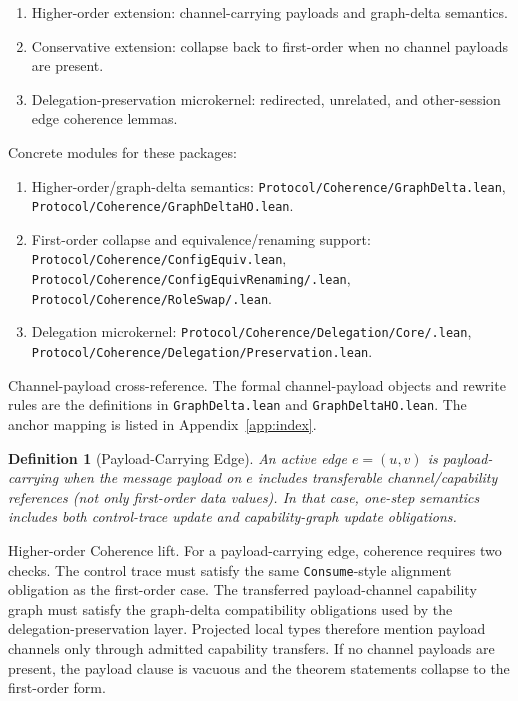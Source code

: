 \documentclass[a4paper,10pt,twocolumn,english]{article}
\numberwithin{equation}{section}
\theoremstyle{paperdef}
\newtheorem{definition}{Definition}[section]
\theoremstyle{paperplain}
\theoremstyle{paperdef}
\theoremstyle{paperremark}
\theoremstyle{paperdef}
\begin{document}
	{\footnotesize
		\begin{enumerate}
			\item Higher-order extension: channel-carrying payloads and graph-delta semantics.
			\item Conservative extension: collapse back to first-order when no channel payloads are present.
			\item Delegation-preservation microkernel: redirected, unrelated, and other-session edge coherence lemmas.
		\end{enumerate}
	}

Concrete modules for these packages:
\begin{enumerate}
	\item Higher-order/graph-delta semantics:
	      \texttt{Protocol/\allowbreak Coherence/\allowbreak GraphDelta.lean},
	      \texttt{Protocol/\allowbreak Coherence/\allowbreak GraphDeltaHO.lean}.
	\item First-order collapse and equivalence/renaming support:
	      \texttt{Protocol/\allowbreak Coherence/\allowbreak ConfigEquiv.lean},
	      \texttt{Protocol/\allowbreak Coherence/\allowbreak ConfigEquivRenaming/\allowbreak *.lean},
	      \texttt{Protocol/\allowbreak Coherence/\allowbreak RoleSwap/\allowbreak *.lean}.
	\item Delegation microkernel:
	      \texttt{Protocol/\allowbreak Coherence/\allowbreak Delegation/\allowbreak Core/\allowbreak *.lean},
	      \texttt{Protocol/\allowbreak Coherence/\allowbreak Delegation/\allowbreak Preservation.lean}.
\end{enumerate}

Channel-payload cross-reference. The formal channel-payload objects and rewrite rules are the definitions in \texttt{GraphDelta.lean} and \texttt{GraphDeltaHO.lean}. The anchor mapping is listed in Appendix~\ref{app:index}.

\begin{definition}[Payload-Carrying Edge]
	An active edge $e=(u,v)$ is payload-carrying when the message payload on $e$
	includes transferable channel/capability references (not only first-order data
	values). In that case, one-step semantics includes both control-trace update and
	capability-graph update obligations.
\end{definition}

Higher-order Coherence lift. For a payload-carrying edge, coherence requires two checks. The control trace must satisfy the same \texttt{Consume}-style alignment obligation as the first-order case. The transferred payload-channel capability graph must satisfy the graph-delta compatibility obligations used by the delegation-preservation layer. Projected local types therefore mention payload channels only through admitted capability transfers. If no channel payloads are present, the payload clause is vacuous and the theorem statements collapse to the first-order form.
\end{document}
